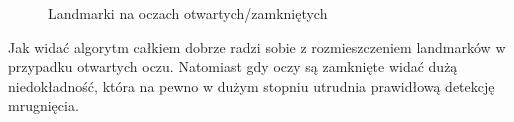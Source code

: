 \documentclass[10pt, a4paper]{article}
\begin{document}
\begin{figure}[H]
    \begin{center}
        \hspace{8mm}
    \end{center}
    \caption{Landmarki na oczach otwartych/zamkniętych}
    \label{fig:landmarks_accuracy_}
\end{figure}

Jak widać algorytm całkiem dobrze radzi sobie z rozmieszczeniem landmarków w przypadku otwartych oczu. Natomiast gdy oczy są zamknięte widać dużą niedokładność, która na pewno w dużym stopniu utrudnia prawidłową detekcję mrugnięcia.

\printbibliography
\end{document}
